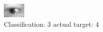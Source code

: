 \begin{figure}[h!]
\begin{center}
\includegraphics[width=0.60\columnwidth]{figures/ID704_class_3_target_4.png}
\end{center}
\caption{ Classification: 3 actual target: 4}
\label{fig:ID704_class_3_target_4}
\end{figure}
